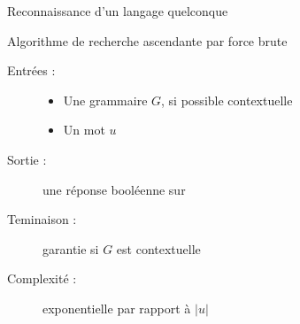 
\begingroup

\begin{frame}{Reconnaissance d'un langage quelconque}
  \begin{block}{Algorithme de recherche ascendante par force brute} 

    \begin{description}
    \item [Entrées :]
      \begin{itemize}
      \item Une grammaire $G$, si possible contextuelle
      \item Un mot $u$
      \end{itemize}

    \item [Sortie :] une réponse booléenne sur 

    \item [Teminaison :] garantie si $G$ est contextuelle
    \item [Complexité :] exponentielle par rapport à $|u|$
    \end{description}
  \end{block}
\end{frame}

\endgroup
